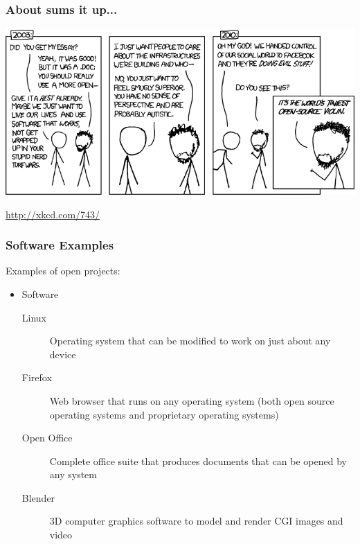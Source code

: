 \documentclass{beamer}
\begin{document}
\begin{frame}
  \frametitle{About sums it up...}
  \begin{center}\includegraphics[width=1\textwidth]{img/violin}\end{center}
  \begin{footnotesize}
    \textcolor{beamer@myblue}{\href{http://xkcd.com/743/}{http://xkcd.com/743/}}
  \end{footnotesize}
\end{frame}

\begin{frame}
  \frametitle{Software Examples}
  Examples of open projects:

  \begin{itemize}
  \item Software
    \begin{description}
    \item[Linux] Operating system that can be modified to work on just
      about any device
    \item[Firefox] Web browser that runs on any operating system (both
      open source operating systems and proprietary operating systems)
    \item[Open Office] Complete office suite that produces documents
      that can be opened by any system
    \item[Blender] 3D computer graphics software to model and render CGI images and video
    \end{description}
    \end{itemize}
\end{frame}
\end{document}
